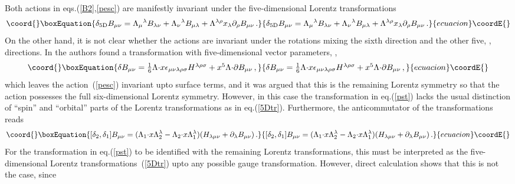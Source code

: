 \documentclass[a4paper,12pt]{article}
\begin{document}
Both actions in eqs.(\ref{B2},\ref{pesc}) are 
manifestly invariant under  the five-dimensional Lorentz transformations
\begin{equation}\coord{}\boxEquation{
\delta_{5{\rm D}}B_{\mu\nu}=\Lambda_{\mu}{}^{\lambda}B_{\lambda\nu}+\Lambda_{\nu}{}^{\lambda}B_{\mu\lambda}+\Lambda^{\lambda\rho}x_{\lambda}\partial_{\rho}B_{\mu\nu}\,.
\label{5Dtr}
}{
\delta_{5{\rm D}}B_{\mu\nu}=\Lambda_{\mu}{}^{\lambda}B_{\lambda\nu}+\Lambda_{\nu}{}^{\lambda}B_{\mu\lambda}+\Lambda^{\lambda\rho}x_{\lambda}\partial_{\rho}B_{\mu\nu}\,.
}{ecuacion}\coordE{}\end{equation}  
On the other hand, it is not clear whether the actions are invariant under the rotations mixing  the sixth direction and  the other five, \myHighlight{$\mu$}\coordHE{}, directions.   In \cite{9611065} the authors found a transformation with five-dimensional vector parameters, 
\myHighlight{$\Lambda_{\mu}$}\coordHE{}, 
\begin{equation}\coord{}\boxEquation{
\delta B_{\mu\nu}=\textstyle{\frac{1}{6}}\Lambda{\cdot x}\epsilon_{\mu\nu\lambda\rho\sigma}H^{\lambda\rho\sigma}+ x^{5}\Lambda{\cdot\partial}B_{\mu\nu}\,,
\label{pst}
}{
\delta B_{\mu\nu}=\textstyle{\frac{1}{6}}\Lambda{\cdot x}\epsilon_{\mu\nu\lambda\rho\sigma}H^{\lambda\rho\sigma}+ x^{5}\Lambda{\cdot\partial}B_{\mu\nu}\,,
}{ecuacion}\coordE{}\end{equation}
which leaves the action~(\ref{pesc}) invariant upto surface terms, and it was argued that this is the remaining Lorentz symmetry so that the action possesses the full six-dimensional Lorentz symmetry.  However, in this case the transformation in eq.(\ref{pst}) lacks the usual distinction of ``spin''  and ``orbital'' parts of the Lorentz transformations as in eq.(\ref{5Dtr}).     
Furthermore, the anticommutator of the transformations reads
\begin{equation}\coord{}\boxEquation{
[\delta_{2},\delta_{1}]B_{\mu\nu}=(\Lambda_{1}{\cdot x}\Lambda_{2}^{\lambda}-\Lambda_{2}{\cdot x}\Lambda_{1}^{\lambda})(H_{\lambda\mu\nu}+\partial_{\lambda}B_{\mu\nu})\,.
\label{com21}
}{
[\delta_{2},\delta_{1}]B_{\mu\nu}=(\Lambda_{1}{\cdot x}\Lambda_{2}^{\lambda}-\Lambda_{2}{\cdot x}\Lambda_{1}^{\lambda})(H_{\lambda\mu\nu}+\partial_{\lambda}B_{\mu\nu})\,.
}{ecuacion}\coordE{}\end{equation}
For the transformation in eq.(\ref{pst}) to be identified with the remaining Lorentz transformations, this must be interpreted as   
the five-dimensional  Lorentz transformations~(\ref{5Dtr})  upto any possible gauge transformation.  However, direct calculation shows that this is not the case, since 
\end{document}
